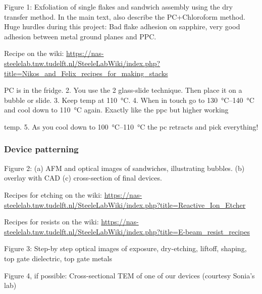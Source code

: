 Figure 1: Exfoliation of single flakes and sandwich assembly using the dry transfer method.
In the main text, also describe the PC+Chloroform method.
Huge hurdles during this project: Bad flake adhesion on sapphire, very good adhesion between metal ground planes and PPC.

Recipe on the wiki: \url{https://nas-steelelab.tnw.tudelft.nl/SteeleLabWiki/index.php?title=Nikos_and_Felix_recipes_for_making_stacks}

PC is in the fridge.
2. You use the 2 glass-slide technique. Then place it on a bubble or slide.
3. Keep temp at \SI{110}{\celsius}.
4. When in touch go to \SIrange{130}{140}{\celsius} and cool down to \SI{110}{\celsius} again. Exactly like the ppc but higher working
   
temp.
5. As you cool down to \SIrange{100}{110}{\celsius} the pc retracts and pick everything!

\subsubsection{Device patterning}

Figure 2: (a) AFM and optical images of sandwiches, illustrating bubbles. (b) overlay with CAD (c) cross-section of final devices.

Recipes for etching on the wiki: \url{https://nas-steelelab.tnw.tudelft.nl/SteeleLabWiki/index.php?title=Reactive_Ion_Etcher}

Recipes for resists on the wiki: \url{https://nas-steelelab.tnw.tudelft.nl/SteeleLabWiki/index.php?title=E-beam_resist_recipes}

Figure 3: Step-by step optical images of exposure, dry-etching, liftoff, shaping, top gate dielectric, top gate metals

Figure 4, if possible: Cross-sectional TEM of one of our devices (courtesy Sonia's lab)


